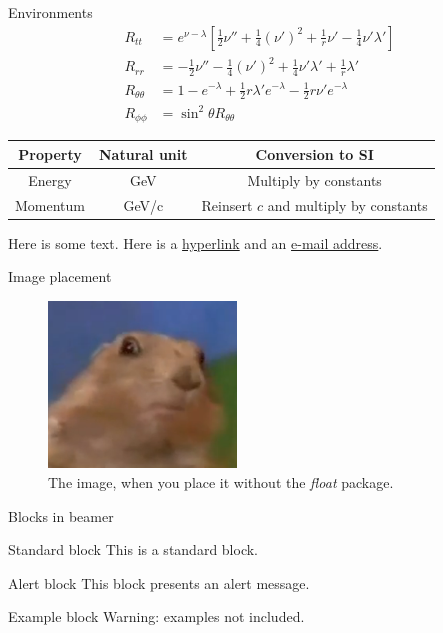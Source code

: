 \documentclass{beamer}
\theoremstyle{definition}
\theoremstyle{remark}
\begin{document}
\begin{frame}{Environments}
$$
\begin{aligned}
R_{t t}&=e^{\nu-\lambda}\left[\frac{1}{2} \nu''+\frac{1}{4}\left(\nu'\right)^2+\frac{1}{r} \nu'-\frac{1}{4} \nu' \lambda'\right]\\
R_{r r}&=-\frac{1}{2} \nu''-\frac{1}{4}\left(\nu'\right)^2+\frac{1}{4} \nu' \lambda'+\frac{1}{r} \lambda' \\
R_{\theta \theta}&=1-e^{-\lambda}+\frac{1}{2} r \lambda' e^{-\lambda}-\frac{1}{2} r \nu' e^{-\lambda} \\
R_{\phi \phi}&=\sin ^2 \theta R_{\theta \theta}
\end{aligned}
$$
\begin{center}
\begin{tabular}{|c|c|c|} 
\hline
Property & Natural unit & Conversion to SI\\\hline
Energy & GeV & Multiply by constants\\\hline
Momentum & GeV/c & Reinsert $c$ and multiply by constants\\\hline
\end{tabular}
\end{center}
Here is some text\footnotemark{}. Here is a \href{https://www.youtube.com/watch?v=dQw4w9WgXcQ}{hyperlink} and an \href{mailto:example@example.org}{e-mail address}.
\end{frame}
\begin{frame}{Image placement}
\begin{figure}[H]
\centering
\includegraphics[width=5cm]{Dramatic_Chipmunk.png}
\caption{The image, when you place it without the \textit{float} package.}
\end{figure}
\end{frame}
\begin{frame}{Blocks in beamer}
\begin{block}{Standard block}
This is a standard block.
\end{block}
\begin{alertblock}{Alert block}
This block presents an alert message.
\end{alertblock}
\begin{exampleblock}{Example block}
Warning: examples not included.
\end{exampleblock}
\end{frame}
\end{document}
